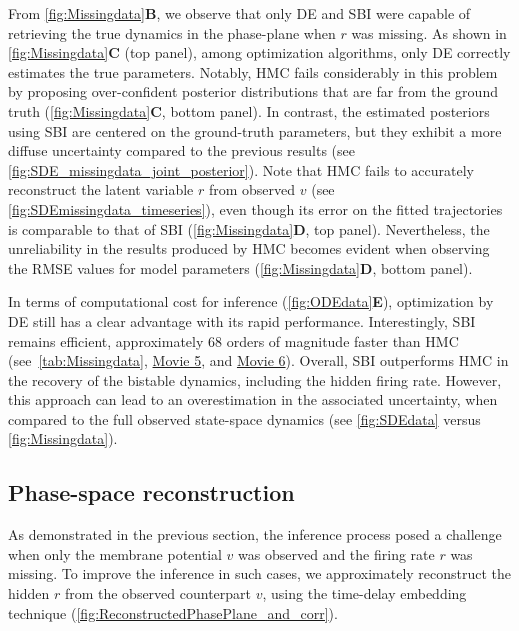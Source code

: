 \documentclass[preprint,11pt,authoryear]{elsarticle}
\begin{document}
From \autoref{fig:Missingdata}\textbf{B}, we observe that only DE and SBI were capable of retrieving the true dynamics in the phase-plane when $r$ was missing. As shown in \autoref{fig:Missingdata}\textbf{C} (top panel), among optimization algorithms, only DE correctly estimates the true parameters. Notably, HMC fails considerably in this problem by proposing over-confident posterior distributions that are far from the ground truth (\autoref{fig:Missingdata}\textbf{C}, bottom panel). In contrast, the estimated posteriors using SBI are centered on the ground-truth parameters, but they exhibit a more diffuse uncertainty compared to the previous results (see \autoref{fig:SDE_missingdata_joint_posterior}).
Note that HMC fails to accurately reconstruct the latent variable $r$ from observed $v$ (see \autoref{fig:SDEmissingdata_timeseries}), even though its error on the fitted trajectories is comparable to that of SBI (\autoref{fig:Missingdata}\textbf{D}, top panel). Nevertheless, the unreliability in the results produced by HMC becomes evident when observing the RMSE values for model parameters (\autoref{fig:Missingdata}\textbf{D}, bottom panel). 

In terms of computational cost for inference (\autoref{fig:ODEdata}\textbf{E}), optimization by DE still has a clear advantage with its rapid performance.
Interestingly, SBI remains efficient, approximately 68 orders of magnitude faster than HMC (see~\autoref{tab:Missingdata},  \href{run:https://github.com/ins-amu/Inference_MFM/blob/main/Videos/Movie5_MPR_SDE_HMC_V.mp4}{Movie 5}, and  \href{run:https://github.com/ins-amu/Inference_MFM/blob/main/Videos/Movie6_MPR_SDE_SBI_V.mp4}{Movie 6}). Overall, SBI outperforms HMC in the recovery of the bistable dynamics, including the hidden firing rate.  However, this approach can lead to an overestimation in the associated uncertainty, when compared to the full observed state-space dynamics (see \autoref{fig:SDEdata} versus \autoref{fig:Missingdata}).



\subsection{Phase-space reconstruction}

As demonstrated in the previous section, the inference process posed a challenge when only the membrane potential $v$ was observed and the firing rate $r$ was missing. To improve the inference in such cases, we approximately reconstruct the hidden $r$ from the observed counterpart $v$, using the time-delay embedding technique (\autoref{fig:ReconstructedPhasePlane_and_corr}). 
\end{document}
